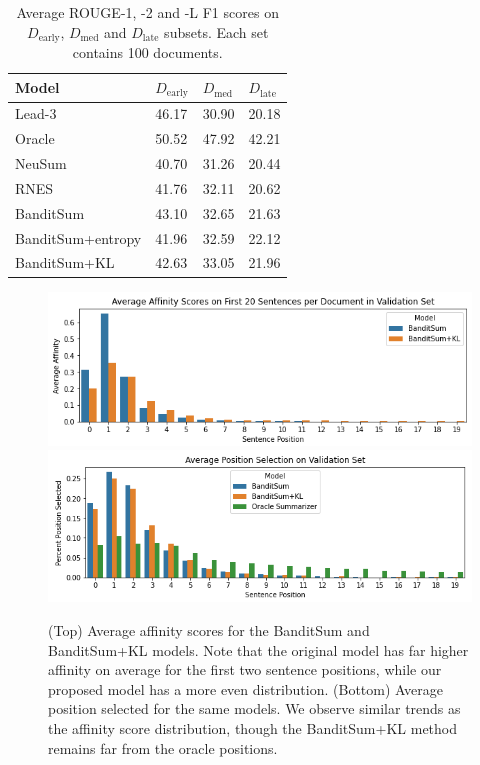 \begin{table}
\centering
\small
\begin{tabular}{l|l|l|l}
\toprule
Model	&	$D_{\mathrm{early}}$	& $D_{\mathrm{med}}$ &	$D_{\mathrm{late}}$	\\ \hline
Lead-3	&	46.17	&	30.90	&	20.18	\\
Oracle	&	50.52	&	47.92	&	42.21	\\
NeuSum	&	40.70	&	31.26	&	20.44	\\
RNES	&	41.76   &   32.11   &   20.62	\\ \hline
BanditSum	&	43.10	&	32.65	&	21.63	\\
BanditSum+entropy	&	41.96	&	32.59	&	22.12	\\
BanditSum+KL	&	42.63	&	33.05	&	21.96	\\
\bottomrule
\end{tabular}
\caption[ROUGE scores on $D_{\mathrm{early}}$, $D_{\mathrm{med}}$ and $D_{\mathrm{late}}$ subsets.]{Average ROUGE-1, -2 and -L F1 scores on $D_{\mathrm{early}}$, $D_{\mathrm{med}}$ and $D_{\mathrm{late}}$ subsets. Each set contains 100 documents.}
\label{d_early}
\end{table}

\begin{figure}[h]
\centering
\includegraphics[width=0.9\linewidth]{fig/avg_affs.png}
\includegraphics[width=0.9\linewidth]{fig/pos_avg.png}
\caption[Average affinity scores and average position selected for the BanditSum and BanditSum+KL models.]{(Top) Average affinity scores for the BanditSum and BanditSum+KL models. Note that the original model has far higher affinity on average for the first two sentence positions, while our proposed model has a more even distribution. (Bottom) Average position selected for the same models. We observe similar trends as the affinity score distribution, though the BanditSum+KL method remains far from the oracle positions.}
\label{fig:avg_pos}
\end{figure}

